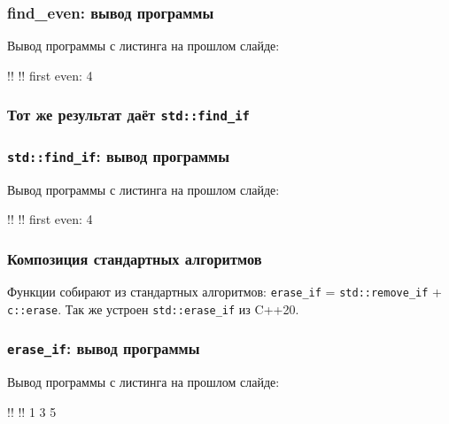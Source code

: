 \documentclass[compress, 8pt, aspectratio=169]{beamer}
\begin{document}
  \begin{frame}[fragile]

    \frametitle{find\_even: вывод программы}

    Вывод программы с листинга на прошлом слайде:

    \begin{terminalwindow}
!!
!!
first even: 4
    \end{terminalwindow}

  \end{frame}

  \begin{frame}[fragile]

    \frametitle{Тот же результат даёт \texttt{std::find\_if}}


  \end{frame}

  \begin{frame}[fragile]

    \frametitle{\texttt{std::find\_if}: вывод программы}

    Вывод программы с листинга на прошлом слайде:

    \begin{terminalwindow}
!!
!!
first even: 4
    \end{terminalwindow}

  \end{frame}

  \begin{frame}[fragile]

    \frametitle{Композиция стандартных алгоритмов}

    Функции собирают из стандартных алгоритмов:
    \texttt{erase\_if} = \texttt{std::remove\_if} + \texttt{c::erase}.
    Так же устроен \texttt{std::erase\_if} из C++20.


  \end{frame}

  \begin{frame}[fragile]

    \frametitle{\texttt{erase\_if}: вывод программы}

    Вывод программы с листинга на прошлом слайде:

    \begin{terminalwindow}
!!
!!
1 3 5
    \end{terminalwindow}

  \end{frame}
\end{document}
